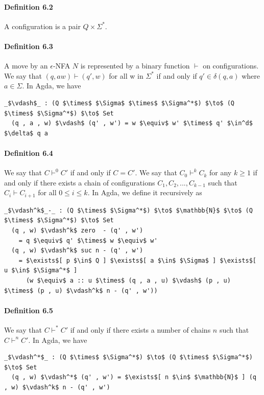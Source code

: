 \documentclass[twoside,openright,final]{bhamthesis}
\begin{document}
\paragraph{Definition 6.2} A configuration is a pair \(Q \times
\Sigma^*\). 

\paragraph{Definition 6.3} A move by an \(\epsilon\)-NFA \(N\) is
represented by a binary function \(\vdash\) on configurations. We say
that \((q, aw) \vdash (q' , w)\) for all w in \(\Sigma^*\)
if and only if \(q' \in \delta (q , a)\) where \(a \in \Sigma\). In
Agda, we have
\begin{lstlisting}[mathescape=true,aboveskip=0pt,belowskip=0pt]
  _$\vdash$_ : (Q $\times$ $\Sigma$ $\times$ $\Sigma^*$) $\to$ (Q $\times$ $\Sigma^*$) $\to$ Set
  (q , a , w) $\vdash$ (q' , w') = w $\equiv$ w' $\times$ q' $\in^d$ $\delta$ q a
\end{lstlisting}

\paragraph{Definition 6.4} We say that \(C \vdash^0 C'\) if and only
if \(C = C'\). We say that \(C_0 \vdash^k C_k\) for any \(k \geq 1\) if and only if there exists a chain of
configurations \(C_1, C_2, ..., C_{k-1}\) such that \(C_i \vdash
C_{i+1}\) for all \(0 \leq i \leq k\). In Agda, we define it
recursively as
\begin{lstlisting}[mathescape=true,aboveskip=0pt,belowskip=0pt]
  _$\vdash^k$_-_ : (Q $\times$ $\Sigma^*$) $\to$ $\mathbb{N}$ $\to$ (Q $\times$ $\Sigma^*$) $\to$ Set
  (q , w) $\vdash^k$ zero  - (q' , w')
    = q $\equiv$ q' $\times$ w $\equiv$ w'
  (q , w) $\vdash^k$ suc n - (q' , w') 
    = $\exists$[ p $\in$ Q ] $\exists$[ a $\in$ $\Sigma$ ] $\exists$[ u $\in$ $\Sigma^*$ ]
      (w $\equiv$ a :: u $\times$ (q , a , u) $\vdash$ (p , u) $\times$ (p , u) $\vdash^k$ n - (q' , w'))
\end{lstlisting}

\paragraph{Definition 6.5} We say that \(C \vdash^* C'\) if and only
if there exists a number of chains \(n\) such that \(C \vdash^n C'\). In Agda,
we have
\begin{lstlisting}[mathescape=true,aboveskip=0pt,belowskip=0pt]
  _$\vdash^*$_ : (Q $\times$ $\Sigma^*$) $\to$ (Q $\times$ $\Sigma^*$) $\to$ Set
  (q , w) $\vdash^*$ (q' , w') = $\exists$[ n $\in$ $\mathbb{N}$ ] (q , w) $\vdash^k$ n - (q' , w')
\end{lstlisting}
\end{document}
